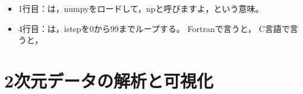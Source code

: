 

\begin{itemize}
    \item 1行目：は，{\ttfamily numpy}をロードして，{\ttfamily np}と呼びますよ，という意味。
    \item 4行目：は，{\ttfamily istep}を0から99までループする。
        Fortranで言うと，
        C言語で言うと，

\end{itemize}


\section{2次元データの解析と可視化}




